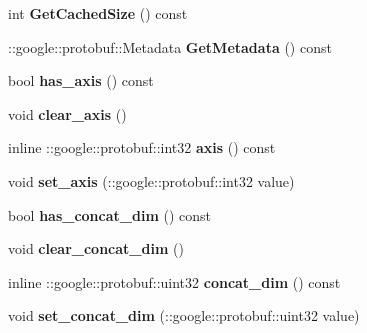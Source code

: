 \begin{DoxyCompactItemize}
int {\bfseries Get\+Cached\+Size} () const
\item 
\mbox{\label{classcaffe_1_1_concat_parameter_aec616da9d5be835ad8e01ea0d88fed8c}} 
\+::google\+::protobuf\+::\+Metadata {\bfseries Get\+Metadata} () const
\item 
\mbox{\label{classcaffe_1_1_concat_parameter_a5f0ec0f7df4e1616858f9e339ae28d4d}} 
bool {\bfseries has\+\_\+axis} () const
\item 
\mbox{\label{classcaffe_1_1_concat_parameter_aa667987a8da285cb5409ce7879f60564}} 
void {\bfseries clear\+\_\+axis} ()
\item 
\mbox{\label{classcaffe_1_1_concat_parameter_a56839bbfcb35e04be3a1b8315d67e3bd}} 
inline \+::google\+::protobuf\+::int32 {\bfseries axis} () const
\item 
\mbox{\label{classcaffe_1_1_concat_parameter_a6d025989922a9ec64014b421ff1f649f}} 
void {\bfseries set\+\_\+axis} (\+::google\+::protobuf\+::int32 value)
\item 
\mbox{\label{classcaffe_1_1_concat_parameter_a07f17e6e972d14432fbfc82fb94618db}} 
bool {\bfseries has\+\_\+concat\+\_\+dim} () const
\item 
\mbox{\label{classcaffe_1_1_concat_parameter_af1e66bf9a750cafeb8fdad78f7f9e9ea}} 
void {\bfseries clear\+\_\+concat\+\_\+dim} ()
\item 
\mbox{\label{classcaffe_1_1_concat_parameter_a0639ee89bef0767778b0aa4c8c5964d0}} 
inline \+::google\+::protobuf\+::uint32 {\bfseries concat\+\_\+dim} () const
\item 
\mbox{\label{classcaffe_1_1_concat_parameter_a02ff0084d1171c03168a3a1822594ba0}} 
void {\bfseries set\+\_\+concat\+\_\+dim} (\+::google\+::protobuf\+::uint32 value)
\item 
\mbox{\label{classcaffe_1_1_concat_parameter_ab88bffcc112e85b55b511dbadbf9f9a9}} 

\end{DoxyCompactItemize}
